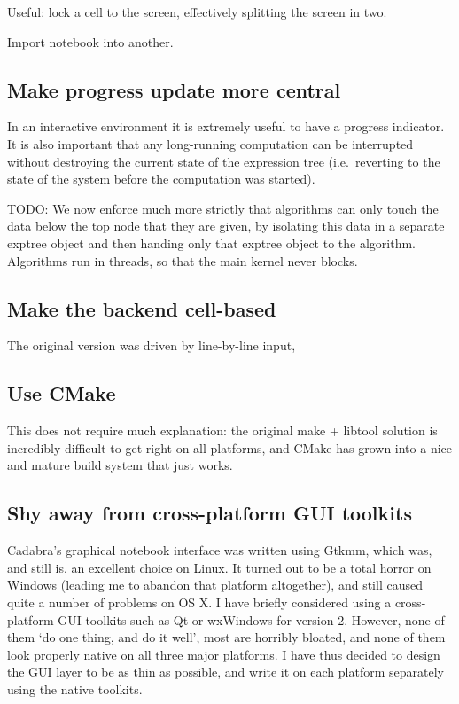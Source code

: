 \documentclass[11pt]{article}
\begin{document}
Useful: lock a cell to the screen, effectively splitting the screen in
two. 

Import notebook into another. 

\subsection{Make progress update more central}

In an interactive environment it is extremely useful to have a
progress indicator. It is also important that any long-running
computation can be interrupted without destroying the current state of
the expression tree (i.e.~reverting to the state of the system before
the computation was started). 

TODO: We now enforce much more strictly that algorithms can only touch the
data below the top node that they are given, by isolating this data in
a separate exptree object and then handing only that exptree object to
the algorithm. Algorithms run in threads, so that the main kernel
never blocks.

\subsection{Make the backend cell-based}

The original version was driven by line-by-line input, 


\subsection{Use CMake}

This does not require much explanation: the original make + libtool
solution is incredibly difficult to get right on all platforms, and
CMake has grown into a nice and mature build system that just works.

\subsection{Shy away from cross-platform GUI toolkits}

Cadabra's graphical notebook interface was written using Gtkmm, which
was, and still is, an excellent choice on Linux. It turned out to be a
total horror on Windows (leading me to abandon that platform
altogether), and still caused quite a number of problems on OS X.  I
have briefly considered using a cross-platform GUI toolkits such as Qt
or wxWindows for version 2. However, none of them `do one thing, and
do it well', most are horribly bloated, and none of them look properly
native on all three major platforms. I have thus decided to design the
GUI layer to be as thin as possible, and write it on each platform
separately using the native toolkits.
\end{document}
